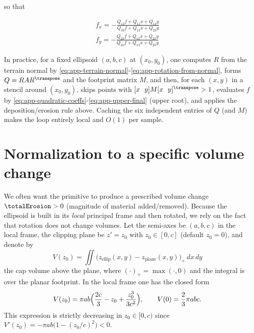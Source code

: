 so that

\begin{align}
    \label{eq:app-fx}
    f_x = -\frac{Q_{13}f + Q_{11}x + Q_{12}y}{Q_{33}f + Q_{13}x + Q_{23}y} \\
    \label{eq:app-fy}
    f_y = -\frac{Q_{23}f + Q_{12}x + Q_{22}y}{Q_{33}f + Q_{13}x + Q_{23}y}
\end{align}

In practice, for a fixed ellipsoid $(a,b,c)$ at $(x_0,y_0)$, one computes $R$ from the terrain normal by \cref{eq:app-terrain-normal}-\cref{eq:app-rotation-from-normal}, forms $Q=RAR^\transpose $ and the footprint matrix $M$, and then, for each $(x,y)$ in a stencil around $(x_0,y_0)$, skips points with $[x\ \ y] M [x\ \ y]^\transpose >1$, evaluates $f$ by \cref{eq:app-quadratic-coeffs}-\cref{eq:app-upper-final} (upper root), and applies the deposition/erosion rule above. Caching the six independent entries of $Q$ (and $M$) makes the loop entirely local and $O(1)$ per sample.



\section*{Normalization to a specific volume change}

We often want the primitive to produce a prescribed volume change $\totalErosion>0$ (magnitude of material added/removed). Because the ellipsoid is built in its \emph{local} principal frame and then rotated, we rely on the fact that rotation does not change volumes. Let the semi-axes be $(a,b,c)$ in the local frame, the clipping plane be $z'=z_0$ with $z_0\in[0,c]$ (default $z_0=0$), and denote by
\[
V(z_0)=\iint \bigl(z_{\text{ellip}}(x,y)-z_{\text{plane}}(x,y)\bigr)_+\,dx\,dy
\]
the cap volume above the plane, where $(\cdot)_+=\max(\cdot,0)$ and the integral is over the planar footprint. In the local frame one has the closed form
\begin{align}
\label{eq:app-cap-volume}
V(z_0)=\pi a b\Bigl(\frac{2c}{3}-z_0+\frac{z_0^3}{3c^2}\Bigr),\qquad V(0)=\frac{2}{3}\pi a b c.
\end{align}
This expression is strictly decreasing in $z_0\in[0,c)$ since $V'(z_0)=-\pi a b\bigl(1-(z_0/c)^2\bigr)<0$.

